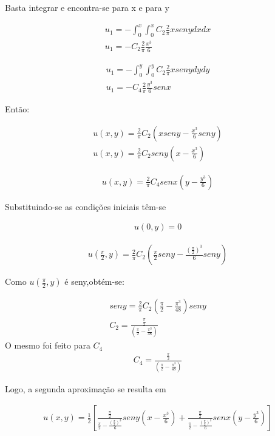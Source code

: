 Basta integrar e encontra-se para x e para y


\begin{gather}
u_{1} = -\int_0^x \int_0^x C_{2}\frac{2}{\pi}xsenydxdx\nonumber\\
u_{1} = -C_{2}\frac{2}{\pi}\frac{x^3}
{6}
\end{gather}

\begin{gather}
u_{1} = -\int_0^y \int_0^y C_{2}\frac{2}{\pi}xsenydydy\nonumber\\
u_{1} = -C_{4}\frac{2}{\pi}\frac{y^3}{6}senx
\end{gather}

Então:

\begin{gather}
u(x,y) = \frac{2}{\pi}C_{2}\left(xseny - \frac{x^3}{6}seny\right)\nonumber\\
u(x,y) = \frac{2}{\pi}C_{2}seny\left(x - \frac{x^3}{6}\right)
\end{gather}

\begin{gather}
u(x,y) = \frac{2}{\pi}C_{4}senx\left(y - \frac{y^3}{6}\right)
\end{gather}

Substituindo-se as  condições iniciais têm-se

\begin{gather}
u(0,y) = 0
\end{gather}

\begin{gather}
u\left(\frac{\pi}{2},y\right) = \frac{2}{\pi}C_{2}\left(\frac{\pi}{2}seny - \frac{(\frac{\pi}{2})^3}{6}seny\right)
\end{gather}

Como $u\left(\frac{\pi}{2},y\right)$ é seny,obtém-se:

\begin{gather}
seny = \frac{2}{\pi}C_{2}\left(\frac{\pi}{2} - \frac{\pi^3}{48}\right)seny\nonumber\\
C_{2} = \frac{\frac{\pi}{2}}{\left(\frac{\pi}{2}-\frac{\pi^3}{48}\right)}
\end{gather}
O mesmo foi feito para $C_{4}$ 
\begin{gather}
C_{4} = \frac{\frac{\pi}{2}}{\left(\frac{\pi}{2}-\frac{\pi^3}{48}\right)}
\end{gather}

Logo, a segunda aproximação se resulta em

\begin{gather}
u(x,y) = \frac{1}{2}\left[ \frac{\frac{\pi}{2}}{\frac{\pi}{2} - \frac{(\frac{\pi}{2})^3}{6}} seny\left(x - \frac{x^3}{6}\right) + \frac{\frac{\pi}{2}}{\frac{\pi}{2} - \frac{(\frac{\pi}{2})^3}{6}} senx\left(y - \frac{y^3}{6}\right)\right]
\end{gather}

